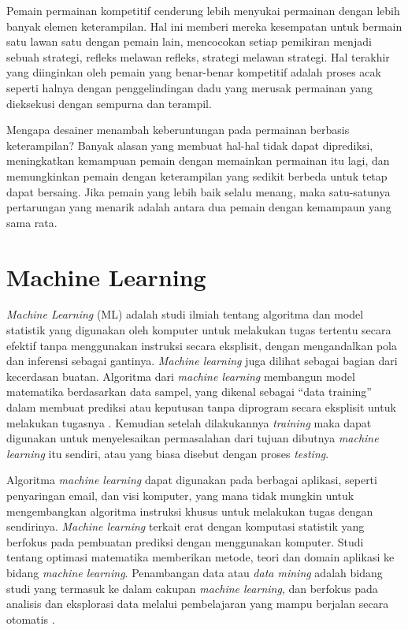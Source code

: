 Pemain permainan kompetitif cenderung lebih menyukai permainan dengan lebih banyak elemen keterampilan. Hal ini memberi mereka kesempatan untuk bermain satu lawan satu dengan pemain lain, mencocokan setiap pemikiran menjadi sebuah strategi, refleks melawan refleks, strategi melawan strategi. Hal terakhir yang diinginkan oleh pemain yang benar-benar kompetitif adalah proses acak seperti halnya dengan penggelindingan dadu yang merusak permainan yang dieksekusi dengan sempurna dan terampil.
\vspace{1ex}

Mengapa desainer menambah keberuntungan pada permainan berbasis keterampilan? Banyak alasan yang membuat hal-hal tidak dapat diprediksi, meningkatkan kemampuan pemain dengan memainkan permainan itu lagi, dan memungkinkan pemain dengan keterampilan yang sedikit berbeda untuk tetap dapat bersaing. Jika pemain yang lebih baik selalu menang, maka satu-satunya pertarungan yang menarik adalah antara dua pemain dengan kemampaun yang sama rata.
\vspace{1ex}

\section{Machine Learning}
\label{sec:sec2_ML}
\vspace{1ex}

\textit{Machine Learning} (ML) adalah studi ilmiah tentang algoritma dan model statistik yang digunakan oleh komputer untuk melakukan tugas tertentu secara efektif tanpa menggunakan instruksi secara eksplisit, dengan mengandalkan pola dan inferensi sebagai gantinya. \textit{Machine learning} juga dilihat sebagai bagian dari kecerdasan buatan. Algoritma dari \textit{machine learning} membangun model matematika berdasarkan data sampel, yang dikenal sebagai ``data training'' dalam membuat prediksi atau keputusan tanpa diprogram secara eksplisit untuk melakukan tugasnya \citep{Koza1996}. Kemudian setelah dilakukannya \textit{training} maka dapat digunakan untuk menyelesaikan permasalahan dari tujuan dibutnya \textit{machine learning} itu sendiri, atau yang biasa disebut dengan proses \textit{testing}.
\vspace{1ex}

Algoritma \textit{machine learning} dapat digunakan pada berbagai aplikasi, seperti penyaringan email, dan visi komputer, yang mana tidak mungkin untuk mengembangkan algoritma instruksi khusus untuk melakukan tugas dengan sendirinya. \textit{Machine learning} terkait erat dengan komputasi statistik yang berfokus pada pembuatan prediksi dengan menggunakan komputer. Studi tentang optimasi matematika memberikan metode, teori dan domain aplikasi ke bidang \textit{machine learning}. Penambangan data atau \textit{data mining} adalah bidang studi yang termasuk ke dalam cakupan \textit{machine learning}, dan berfokus pada analisis dan eksplorasi data melalui pembelajaran yang mampu berjalan secara otomatis \citep{Friedman1997}.
\vspace{1ex}

